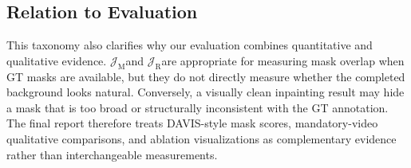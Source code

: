 \documentclass[10pt,twocolumn,letterpaper]{article}
\newcommand{\jm}{\ensuremath{\mathcal{J}_{\mathrm{M}}}}
\newcommand{\jr}{\ensuremath{\mathcal{J}_{\mathrm{R}}}}
\begin{document}
\subsection{Relation to Evaluation}
This taxonomy also clarifies why our evaluation combines quantitative and qualitative evidence. \jm and \jr are appropriate for measuring mask overlap when GT masks are available, but they do not directly measure whether the completed background looks natural. Conversely, a visually clean inpainting result may hide a mask that is too broad or structurally inconsistent with the GT annotation. The final report therefore treats DAVIS-style mask scores, mandatory-video qualitative comparisons, and ablation visualizations as complementary evidence rather than interchangeable measurements.
\end{document}
